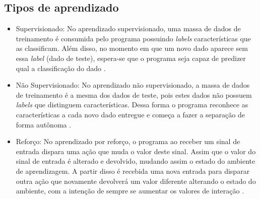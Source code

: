 \subsection{Tipos de aprendizado}
    \begin{itemize}
        \item Supervisionado: No aprendizado supervisionado, uma massa de dados de treinamento é consumida pelo programa possuindo \textit{labels} características que as classificam. Além disso, no momento em que um novo dado aparece sem essa \textit{label} (dado de teste), espera-se que o programa seja capaz de predizer qual a classificação do dado \cite{brink2015}.
        \item Não Supervisionado: No aprendizado não supervisionado, a massa de dados de treinamento é a mesma dos dados de teste, pois estes dados não possuem \textit{labels} que distinguem características. Dessa forma o programa reconhece as características a cada novo dado entregue e começa a fazer a separação de forma autônoma \cite{chao2011}.
        \item Reforço: No aprendizado por reforço, o programa ao receber um sinal de entrada dispara uma ação que muda o valor deste sinal. Assim que o valor do sinal de entrada é alterado e devolvido, mudando assim o estado do ambiente de aprendizagem. A partir disso é recebida uma nova entrada para disparar outra ação que novamente devolverá um valor diferente alterando o estado do ambiente, com a intenção de sempre se aumentar os valores de interação \cite{kaelbling1996}.
    \end{itemize}



